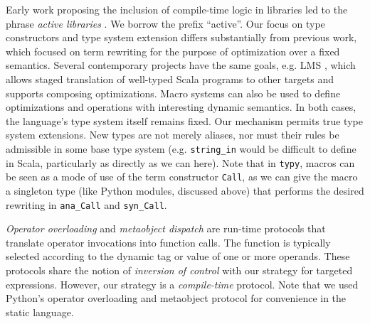 \documentclass{sigplanconf}
\newcommand{\lip}[1]{\lstinline[language=Python,basicstyle=\ttfamily\small,deletendkeywords={tuple,buffer,map}]{#1}}
\begin{document}
Early work proposing the inclusion of compile-time logic in libraries led to the phrase {\it active libraries} \cite{activelibraries}. We borrow the prefix ``active''. Our focus on type constructors and type system extension differs substantially from previous work, which focused on term rewriting for the purpose of optimization over a fixed semantics. Several contemporary projects have the same goals, e.g. LMS \cite{Rompf:2012:LMS}, which allows staged translation of well-typed Scala programs to other targets and supports composing optimizations. Macro systems can also be used to define optimizations and operations with interesting dynamic semantics. In both cases, the language's type system itself remains fixed. Our mechanism permits true type system extensions. New types are not merely aliases, nor must their rules be admissible in some base type system (e.g. \lip{string_in} would be difficult to define in Scala, particularly as directly as we can here). Note that in \texttt{typy}, macros can be seen as a mode of use of the term constructor \verb|Call|, as we can give the macro a singleton type (like Python modules, discussed above) that performs the desired rewriting in \verb|ana_Call| and \verb|syn_Call|.


{\it Operator overloading} \cite{vanWijngaarden:Mailloux:Peck:Koster:Sintzoff:Lindsey:Meertens:Fisker:acta:1975} and {\it metaobject dispatch} \cite{Kiczales91} are run-time protocols that translate operator invocations into function calls. The function is typically selected according to the dynamic tag or value of one or more operands. These protocols share the notion of {\it inversion of control} with our strategy for targeted expressions. However, our strategy is a {\it compile-time} protocol. Note that we used Python's operator overloading and metaobject protocol for convenience in the static language. %
\end{document}
